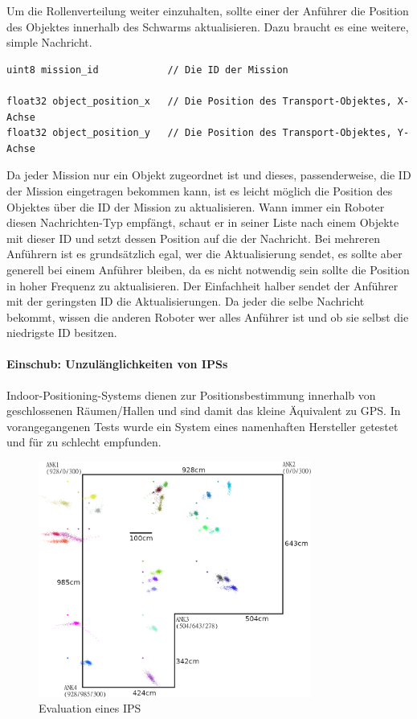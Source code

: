 Um die Rollenverteilung weiter einzuhalten, sollte einer der Anführer die Position des Objektes innerhalb des Schwarms aktualisieren. Dazu braucht es eine weitere, simple Nachricht.

\begin{lstlisting}[style=ros, title=Nachrichten-Typ: Update\_Object.msg]
uint8 mission_id			// Die ID der Mission

float32 object_position_x	// Die Position des Transport-Objektes, X-Achse
float32 object_position_y	// Die Position des Transport-Objektes, Y-Achse
\end{lstlisting}

Da jeder Mission nur ein Objekt zugeordnet ist und dieses, passenderweise, die ID der Mission eingetragen bekommen kann, ist es leicht möglich die Position des Objektes über die ID der Mission zu aktualisieren. Wann immer ein Roboter diesen Nachrichten-Typ empfängt, schaut er in seiner Liste nach einem Objekte mit dieser ID und setzt dessen Position auf die der Nachricht. Bei mehreren Anführern ist es grundsätzlich egal, wer die Aktualisierung sendet, es sollte aber generell bei einem Anführer bleiben, da es nicht notwendig sein sollte die Position in hoher Frequenz zu aktualisieren. Der Einfachheit halber sendet der Anführer mit der geringsten ID die Aktualisierungen. Da jeder die selbe Nachricht bekommt, wissen die anderen Roboter wer alles Anführer ist und ob sie selbst die niedrigste ID besitzen.

\paragraph*{Einschub: Unzulänglichkeiten von IPSs}\label{subsubsec:IPS}

Indoor-Positioning-Systems dienen zur Positionsbestimmung innerhalb von geschlossenen Räumen/Hallen und sind damit das kleine Äquivalent zu GPS. In vorangegangenen Tests wurde ein System eines namenhaften Hersteller getestet und für zu schlecht empfunden.

\begin{figure}[h]
	\centering
	\includegraphics[width=0.8\textwidth,keepaspectratio]{graphics/Solcon/old.png}
	\caption{Evaluation eines IPS}
	\label{pic:SolconIPS}
\end{figure}

